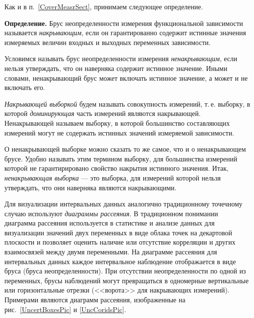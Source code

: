 \documentclass[a5paper,openany]{book}
\begin{document}
Как и в п.~\ref{CoverMeasrSect}, принимаем следующее определение.

{\bf Определение.}
	Брус неопределенности измерения функциональной зависимости называется \textsl{накрывающим}, 
	если он гарантированно содержит истинные значения измеряемых величин входных и выходных 
	переменных зависимости.        

Условимся называть брус неопределенности измерения \emph{ненакрывающим}, если нельзя утверждать, что он наверняка содержит 
истинное значение. Иными словами, ненакрывающий брус может включать 
истинное значение, а может и не включать его.        

\textit{Накрывающей выборкой} будем называть совокупность измерений, т.\,е. 
выборку, в которой \emph{доминирующая} часть измерений 
являются накрывающей. Ненакрывающей называем выборку, в которой большинство составляющих 
измерений могут не содержать истинных значений измеряемой зависимости. 

О ненакрывающей выборке можно сказать то же самое, что и о
ненакрывающем брусе. Удобно называть этим термином выборку, для большинства измерений которой не гарантирировано свойство накрытия истинного значения. Итак, \emph{ненакрывающая выборка} --- это выборка, для измерений которой нельзя утверждать, что они наверняка являются накрывающими.               

Для визуализации интервальных данных аналогично традиционному точечному случаю 
используют \emph{диаграммы рассеяния}. В традиционном понимании диаграмма рассеяния 
используется в статистике и анализе данных для визуализации значений двух переменных 
в виде облака точек на декартовой плоскости и позволяет оценить наличие или 
отсутствие корреляции и других взаимосвязей между двумя переменными. На диаграмме 
рассеяния для интервальных данных каждое интервальное наблюдение отображается в виде 
бруса (бруса неопределенности). При отсутствии неопределенности по одной из переменных, 
брусы наблюдений могут превращаться в одномерные вертикальные или горизонтальные отрезки 
(<<ворота>> для накрывающих измерений). Примерами 
являются диаграмм рассеяния, изображенные на  рис.~\ref{UncertBoxesPic} и \ref{UncCoridsPic}. 

\end{document}
